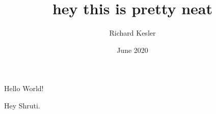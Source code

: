 \documentclass{article}
\title{hey this is pretty neat}
\author{Richard Kesler}
\date{June 2020}
\begin{document}
	\maketitle
	Hello World!

	Hey Shruti.
\end{document}
